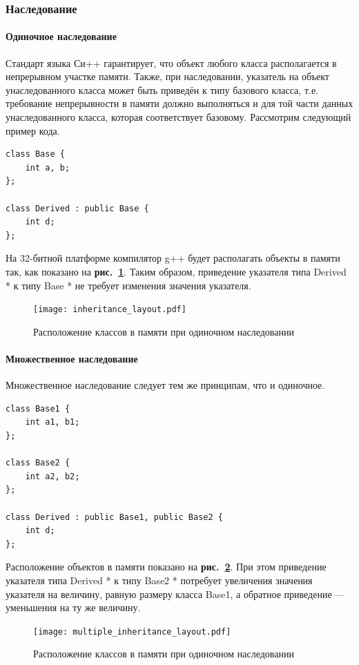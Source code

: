 \documentclass[a4paper,12pt,russian]{article}
\newcommand{\picref}[1]{\textbf{рис.~\ref{#1}}}
\newcommand{\code}[1]{\textsf{#1}}
\begin{document}
\subsubsection{Наследование}
\paragraph{Одиночное наследование}
Стандарт языка Си++ \cite{cpp_standard} гарантирует, что объект любого класса располагается в непрерывном участке памяти.
Также, при наследовании, указатель на объект унаследованного класса может быть приведён к типу базового класса, т.е. требование непрерывности в памяти должно выполняться и для той части данных унаследованного класса, которая соответствует базовому.
Рассмотрим следующий пример кода.
\begin{lstlisting}
class Base {
    int a, b;
};

class Derived : public Base {
    int d;
};
\end{lstlisting}
На 32-битной платформе компилятор g++ будет располагать объекты в памяти так, как показано на \picref{inheritance_layout_fig}. Таким образом, приведение указателя типа \code{Derived *} к типу \code{Base *} не требует изменения значения указателя.
\begin{figure}
  \center
  \texttt{[image: inheritance\_layout.pdf]}
  \hfill
  \caption{Расположение классов в памяти при одиночном наследовании}
  \label{inheritance_layout_fig}
\end{figure}

\paragraph{Множественное наследование}
Множественное наследование следует тем же принципам, что и одиночное.
\begin{lstlisting}
class Base1 {
    int a1, b1;
};

class Base2 {
    int a2, b2;
};

class Derived : public Base1, public Base2 {
    int d;
};
\end{lstlisting}
Расположение объектов в памяти показано на \picref{multiple_inheritance_layout_fig}.
При этом приведение указателя типа \code{Derived *} к типу \code{Base2 *} потребует увеличения значения указателя на величину, равную размеру класса \code{Base1}, а обратное приведение --- уменьшения на ту же величину.
\begin{figure}
  \center
  \texttt{[image: multiple\_inheritance\_layout.pdf]}
  \hfill
  \caption{Расположение классов в памяти при одиночном наследовании}
  \label{multiple_inheritance_layout_fig}
\end{figure}
\end{document}
